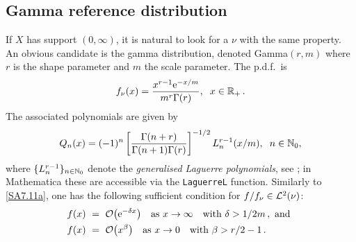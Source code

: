 \subsection{Gamma reference distribution}\label{SS:GammaNu}
If $X$ has support $(0,\infty)$, it is natural to look for a $\nu$ with the same property.
An obvious candidate is the
gamma distribution, denoted Gamma$(r,m)$ where $r$ is the shape parameter
and $m$ the scale parameter.
The p.d.f.\ is
\begin{equation} \label{GammaPDF}
f_{\nu}(x)=\frac{x^{r-1} \mathrm{e}^{-x/m}}{m^{r}\Gamma(r)},\hspace{0.2cm}x\in \mathbb{R}_+ \,.
\end{equation}
The associated polynomials are given by
\begin{equation} \label{OrthogonalPolynomialGammaDistribution}
Q_{n}(x)=(-1)^{n}\left[\frac{\Gamma(n+r)}{\Gamma(n+1)\Gamma(r)}\right]^{-1/2}L_{n}^{r-1}(x/m),\hspace{0.2cm} n\in\mathbb{N}_0,
\end{equation}
where $\{L^{r-1}_{n}\}_{n\in\mathbb{N}_0}$ denote the \emph{generalised Laguerre polynomials}, see \cite{Sz39}; in Mathematica these are accessible via the \texttt{LaguerreL} function.
Similarly to \eqref{SA7.11a}, one has the following sufficient condition for $f/f_\nu\in\mathcal{L}^2(\nu)$:
\begin{gather}\begin{split}\label{SA7.11b}
f(x)\ &=\ {\mathcal{O}}\big(\mathrm{e}^{-\delta x}\big)\quad\text{as }x\to\infty\quad\text{with } \delta>1/2m\,, \text{ and }\\
f(x)\ &=\ {\mathcal{O}}\big(x^\beta\big)\quad\text{as }x\to 0\quad\text{with }\beta>r/2-1\,.
\end{split}\end{gather}

